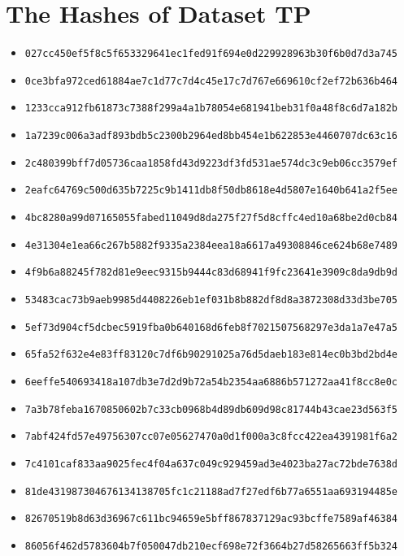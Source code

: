 \section{The Hashes of Dataset TP}\label{appendix:hashes dataset tp}
{\footnotesize
\begin{itemize}
    \item \texttt{027cc450ef5f8c5f653329641ec1fed91f694e0d229928963b30f6b0d7d3a745}
    \item \texttt{0ce3bfa972ced61884ae7c1d77c7d4c45e17c7d767e669610cf2ef72b636b464}
    \item \texttt{1233cca912fb61873c7388f299a4a1b78054e681941beb31f0a48f8c6d7a182b}
    \item \texttt{1a7239c006a3adf893bdb5c2300b2964ed8bb454e1b622853e4460707dc63c16}
    \item \texttt{2c480399bff7d05736caa1858fd43d9223df3fd531ae574dc3c9eb06cc3579ef}
    \item \texttt{2eafc64769c500d635b7225c9b1411db8f50db8618e4d5807e1640b641a2f5ee}
    \item \texttt{4bc8280a99d07165055fabed11049d8da275f27f5d8cffc4ed10a68be2d0cb84}
    \item \texttt{4e31304e1ea66c267b5882f9335a2384eea18a6617a49308846ce624b68e7489}
    \item \texttt{4f9b6a88245f782d81e9eec9315b9444c83d68941f9fc23641e3909c8da9db9d}
    \item \texttt{53483cac73b9aeb9985d4408226eb1ef031b8b882df8d8a3872308d33d3be705}
    \item \texttt{5ef73d904cf5dcbec5919fba0b640168d6feb8f7021507568297e3da1a7e47a5}
    \item \texttt{65fa52f632e4e83ff83120c7df6b90291025a76d5daeb183e814ec0b3bd2bd4e}
    \item \texttt{6eeffe540693418a107db3e7d2d9b72a54b2354aa6886b571272aa41f8cc8e0c}
    \item \texttt{7a3b78feba1670850602b7c33cb0968b4d89db609d98c81744b43cae23d563f5}
    \item \texttt{7abf424fd57e49756307cc07e05627470a0d1f000a3c8fcc422ea4391981f6a2}
    \item \texttt{7c4101caf833aa9025fec4f04a637c049c929459ad3e4023ba27ac72bde7638d}
    \item \texttt{81de431987304676134138705fc1c21188ad7f27edf6b77a6551aa693194485e}
    \item \texttt{82670519b8d63d36967c611bc94659e5bff867837129ac93bcffe7589af46384}
    \item \texttt{86056f462d5783604b7f050047db210ecf698e72f3664b27d58265663ff5b324}

\end{itemize}}
